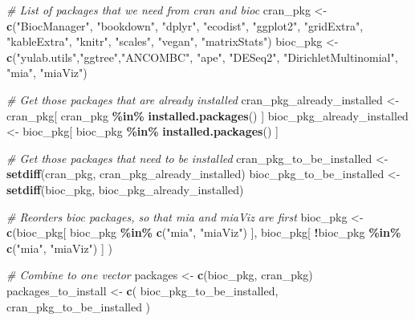 \documentclass[
  oneside]{book}
\newenvironment{Shaded}{\begin{snugshade}}{\end{snugshade}}
\newcommand{\CommentTok}[1]{\textcolor[rgb]{0.56,0.35,0.01}{\textit{#1}}}
\newcommand{\KeywordTok}[1]{\textcolor[rgb]{0.13,0.29,0.53}{\textbf{#1}}}
\newcommand{\NormalTok}[1]{#1}
\newcommand{\OperatorTok}[1]{\textcolor[rgb]{0.81,0.36,0.00}{\textbf{#1}}}
\newcommand{\StringTok}[1]{\textcolor[rgb]{0.31,0.60,0.02}{#1}}
\begin{document}
\begin{Shaded}
\begin{Highlighting}[]
\CommentTok{\# List of packages that we need from cran and bioc }
\NormalTok{cran\_pkg \textless{}{-}}\StringTok{ }\KeywordTok{c}\NormalTok{(}\StringTok{"BiocManager"}\NormalTok{, }\StringTok{"bookdown"}\NormalTok{, }\StringTok{"dplyr"}\NormalTok{, }\StringTok{"ecodist"}\NormalTok{, }\StringTok{"ggplot2"}\NormalTok{, }
              \StringTok{"gridExtra"}\NormalTok{, }\StringTok{"kableExtra"}\NormalTok{,  }\StringTok{"knitr"}\NormalTok{, }\StringTok{"scales"}\NormalTok{, }\StringTok{"vegan"}\NormalTok{, }\StringTok{"matrixStats"}\NormalTok{)}
\NormalTok{bioc\_pkg \textless{}{-}}\StringTok{ }\KeywordTok{c}\NormalTok{(}\StringTok{"yulab.utils"}\NormalTok{,}\StringTok{"ggtree"}\NormalTok{,}\StringTok{"ANCOMBC"}\NormalTok{, }\StringTok{"ape"}\NormalTok{, }\StringTok{"DESeq2"}\NormalTok{, }\StringTok{"DirichletMultinomial"}\NormalTok{, }\StringTok{"mia"}\NormalTok{, }\StringTok{"miaViz"}\NormalTok{)}

\CommentTok{\# Get those packages that are already installed}
\NormalTok{cran\_pkg\_already\_installed \textless{}{-}}\StringTok{ }\NormalTok{cran\_pkg[ cran\_pkg }\OperatorTok{\%in\%}\StringTok{ }\KeywordTok{installed.packages}\NormalTok{() ]}
\NormalTok{bioc\_pkg\_already\_installed \textless{}{-}}\StringTok{ }\NormalTok{bioc\_pkg[ bioc\_pkg }\OperatorTok{\%in\%}\StringTok{ }\KeywordTok{installed.packages}\NormalTok{() ]}

\CommentTok{\# Get those packages that need to be installed}
\NormalTok{cran\_pkg\_to\_be\_installed \textless{}{-}}\StringTok{ }\KeywordTok{setdiff}\NormalTok{(cran\_pkg, cran\_pkg\_already\_installed)}
\NormalTok{bioc\_pkg\_to\_be\_installed \textless{}{-}}\StringTok{ }\KeywordTok{setdiff}\NormalTok{(bioc\_pkg, bioc\_pkg\_already\_installed)}

\CommentTok{\# Reorders bioc packages, so that mia and miaViz are first}
\NormalTok{bioc\_pkg \textless{}{-}}\StringTok{ }\KeywordTok{c}\NormalTok{(bioc\_pkg[ bioc\_pkg }\OperatorTok{\%in\%}\StringTok{ }\KeywordTok{c}\NormalTok{(}\StringTok{"mia"}\NormalTok{, }\StringTok{"miaViz"}\NormalTok{) ], }
\NormalTok{              bioc\_pkg[ }\OperatorTok{!}\NormalTok{bioc\_pkg }\OperatorTok{\%in\%}\StringTok{ }\KeywordTok{c}\NormalTok{(}\StringTok{"mia"}\NormalTok{, }\StringTok{"miaViz"}\NormalTok{) ] ) }

\CommentTok{\# Combine to one vector}
\NormalTok{packages \textless{}{-}}\StringTok{ }\KeywordTok{c}\NormalTok{(bioc\_pkg, cran\_pkg)}
\NormalTok{packages\_to\_install \textless{}{-}}\StringTok{ }\KeywordTok{c}\NormalTok{( bioc\_pkg\_to\_be\_installed, cran\_pkg\_to\_be\_installed )}
\end{Highlighting}
\end{Shaded}
\end{document}
